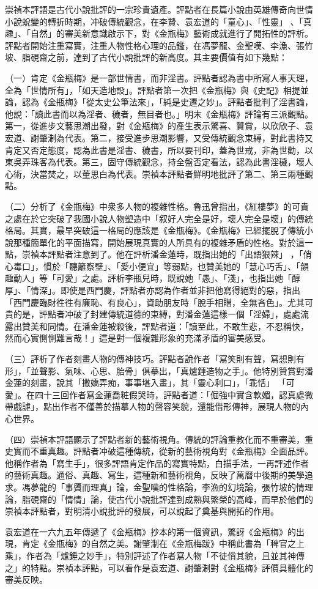 崇禎本評語是古代小說批評的一宗珍貴遺產。評點者在長篇小說由英雄傳奇向世情小說蛻變的轉折時期，冲破傳統觀念，在李贄、袁宏道的「童心」、「性靈」 、「真趣」、「自然」的審美新意識啟示下，對《金瓶梅》藝術成就進行了開拓性的評析。評點者開始注重寫實，注重人物性格心理的品鑑，在馮夢龍、金聖嘆、李漁、張竹坡、脂硯齋之前，達到了古代小說批評的新高度。其主要價值有如下幾點：

（一）肯定《金瓶梅》是一部世情書，而非淫書。評點者認為書中所寫人事天理，全為「世情所有」，「如天造地設」。評點者第一次把《金瓶梅》與《史記》相提並論，認為《金瓶梅》「從太史公筆法來」，「純是史遷之妙」。評點者批判了淫書論，他說：「讀此書而以為淫者、穢者，無目者也。」明末《金瓶梅》評論有三派觀點。第一，從進步文藝思潮出發，對《金瓶梅》的產生表示驚喜、贊賞，以欣欣子、袁宏道、謝肇淛為代表。第二，接受進步思潮影響，又受傳統觀念束縛，對此書持又肯定又否定態度，認為此書是淫書、穢書，所以要刊印，蓋為世戒，非為世勸，以東吳弄珠客為代表。第三，固守傳統觀念，持全盤否定看法，認為此書淫穢，壞人心術，決當焚之，以董思白為代表。崇禎本評點者鮮明地批評了第二、第三兩種觀點。

（二）分析了《金瓶梅》中衆多人物的複雜性格。魯迅曾指出，《紅樓夢》的可貴之處在於它突破了我國小說人物塑造中「叙好人完全是好，壞人完全是壞」的傳統格局。其實，最早突破這一格局的應該是《金瓶梅》。《金瓶梅》已經擺脫了傳統小說那種簡單化的平面描寫，開始展現真實的人所具有的複雜矛盾的性格。對於這一點，崇禎本評點者注意到了。他在評析潘金蓮時，既指出她的「出語狠辣」 ，「俏心毒口」，慣於「聽籬察壁」、「愛小便宜」等弱點，也贊美她的「慧心巧舌」、「韻趣動人」等「可愛」之處。評析李瓶兒時，既說她「愚」、「淺」，也指出她「醇厚」、「情深」。即使是西門慶，評點者亦認為作者並非把他寫得絕對的惡，指出「西門慶臨財徃徃有廉恥、有良心」，資助朋友時「脫手相贈，全無吝色」。尤其可貴的是，評點者冲破了封建傳統道德的束縛，對潘金蓮這樣一個「淫婦」，處處流露出贊美和同情。在潘金蓮被殺後，評點者道：「讀至此，不敢生悲，不忍稱快，然而心實惻惻難言哉！」這是對一個複雜形象的充滿矛盾的審美感受。

（三）評析了作者刻畫人物的傳神技巧。評點者說作者「寫笑則有聲，寫想則有形」，「並聲影、氣味、心思、胎骨」俱摹出，「真爐錘造物之手」。他特別贊賞對潘金蓮的刻畫，說其「撒嬌弄痴，事事堪入畫」，其「靈心利口」，「乖恬」 「可愛」。在四十三回作者寫金蓮喬粧假哭時，評點者道：「倔強中實含軟媚，認真處微帶戲謔」，點出作者不僅善於描摹人物的聲容笑貌，還能借形傳神，展現人物的內心世界。

（四）崇禎本評語顯示了評點者新的藝術視角。傳統的評論重教化而不重審美，重史實而不重真趣。評點者冲破這種傳統，從新的藝術視角對《金瓶梅》全面品評。他稱作者為「寫生手」，很多評語肯定作品的寫實特點，白描手法，一再評述作者的藝術真趣。通俗、真趣、寫生，這種新和藝術視角，反映了萬曆中後期的美學追求。馮夢龍的「事贗而理真」論，金聖嘆的性格論，李漁的幻境論，張竹坡的情理論，脂硯齋的「情情」論，使古代小說批評達到成熟與繁榮的高峰，而早於他們的崇禎本評點者，對明清小說批評的發展，可以說起了奠基與開拓的作用。

袁宏道在一六九五年傳遞了《金瓶梅》抄本的第一個資訊，驚訝《金瓶梅》的出現，肯定《金瓶梅》的自然之美。謝肇淛在《金瓶梅跋》中稱此書為「稗官之上乘」，作者為「爐錘之妙手」，特別評述了作者寫人物「不徒俏其貌，且並其神傳之」的特點。崇禎本評點，可以看作是袁宏道、謝肇淛對《金瓶梅》評價具體化的審美反映。


